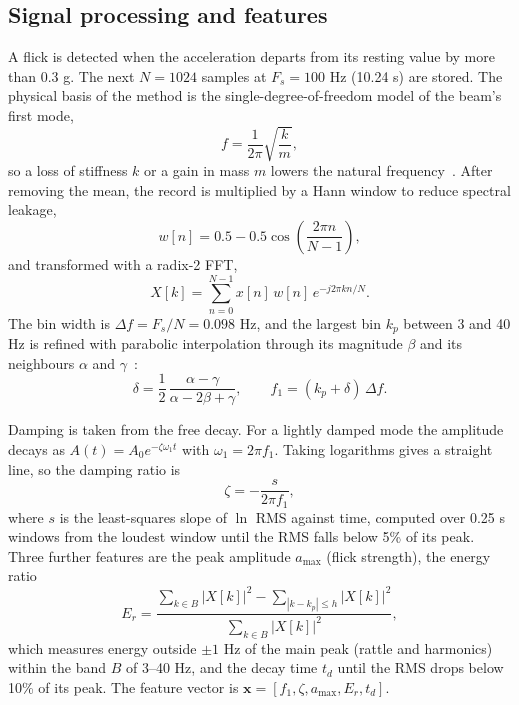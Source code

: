 \documentclass[conference]{IEEEtran}
\begin{document}
\subsection{Signal processing and features}
A flick is detected when the acceleration departs from its resting value by more than 0.3 g. The next $N=1024$ samples at $F_s=100$ Hz (10.24 s) are stored. The physical basis of the method is the single-degree-of-freedom model of the beam's first mode,
\begin{equation}
f = \frac{1}{2\pi}\sqrt{\frac{k}{m}},
\label{eq:sdof}
\end{equation}
so a loss of stiffness $k$ or a gain in mass $m$ lowers the natural frequency~\cite{hou2021}. After removing the mean, the record is multiplied by a Hann window to reduce spectral leakage,
\begin{equation}
w[n] = 0.5 - 0.5\cos\!\left(\frac{2\pi n}{N-1}\right),
\end{equation}
and transformed with a radix-2 FFT,
\begin{equation}
X[k] = \sum_{n=0}^{N-1} x[n]\,w[n]\,e^{-j2\pi kn/N}.
\end{equation}
The bin width is $\Delta f = F_s/N = 0.098$ Hz, and the largest bin $k_p$ between 3 and 40 Hz is refined with parabolic interpolation through its magnitude $\beta$ and its neighbours $\alpha$ and $\gamma$~\cite{belega2021}:
\begin{equation}
\delta = \frac{1}{2}\,\frac{\alpha-\gamma}{\alpha-2\beta+\gamma},\qquad f_1 = (k_p+\delta)\,\Delta f.
\label{eq:interp}
\end{equation}

Damping is taken from the free decay. For a lightly damped mode the amplitude decays as $A(t)=A_0e^{-\zeta\omega_1 t}$ with $\omega_1 = 2\pi f_1$. Taking logarithms gives a straight line, so the damping ratio is
\begin{equation}
\zeta = -\frac{s}{2\pi f_1},
\label{eq:damp}
\end{equation}
where $s$ is the least-squares slope of $\ln$ RMS against time, computed over 0.25 s windows from the loudest window until the RMS falls below 5\% of its peak. Three further features are the peak amplitude $a_{\max}$ (flick strength), the energy ratio
\begin{equation}
E_r = \frac{\sum_{k\in B} |X[k]|^2 - \sum_{|k-k_p|\le h} |X[k]|^2}{\sum_{k\in B} |X[k]|^2},
\end{equation}
which measures energy outside $\pm1$ Hz of the main peak (rattle and harmonics) within the band $B$ of 3--40 Hz, and the decay time $t_d$ until the RMS drops below 10\% of its peak. The feature vector is $\mathbf{x} = [f_1, \zeta, a_{\max}, E_r, t_d]$.
\end{document}
